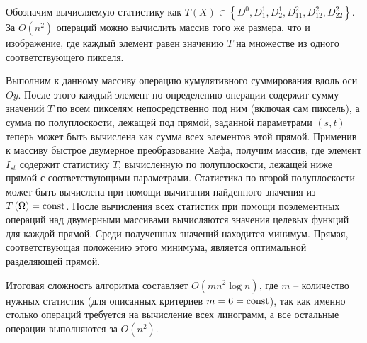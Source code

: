 Обозначим вычисляемую статистику как $T\left( X \right) \in \left\{ D^0, D^1_1, D^1_2, D^2_{11}, D^2_{12}, D^2_{22} \right\}$. За $O\left( n^2 \right)$ операций можно вычислить массив того же размера, что и изображение, где каждый элемент равен значению $T$ на множестве из одного соответствующего пикселя.

Выполним к данному массиву операцию кумулятивного суммирования вдоль оси $Oy$. После этого каждый элемент по определению операции содержит сумму значений $T$ по всем пикселям непосредственно под ним (включая сам пиксель), а сумма по полуплоскости, лежащей под прямой, заданной параметрами $(s, t)$ теперь может быть вычислена как сумма всех элементов этой прямой. Применив к массиву быстрое двумерное преобразование Хафа, получим массив, где элемент $I_{st}$ содержит статистику $T$, вычисленную по полуплоскости, лежащей ниже прямой с соответствующими параметрами. Статистика по второй полуплоскости может быть вычислена при помощи вычитания найденного значения из $T\left( \Omega \right) = \mathrm{const}$. После вычисления всех статистик при помощи поэлементных операций над двумерными массивами вычисляются значения целевых функций для каждой прямой. Среди полученных значений находится минимум. Прямая, соответствующая положению этого минимума, является оптимальной разделяющей прямой.

Итоговая сложность алгоритма составляет $O\left( m n^2 \log n \right)$, где $m$ -- количество нужных статистик (для описанных критериев $m = 6 = \mathrm{const}$), так как именно столько операций требуется на вычисление всех линограмм, а все остальные операции выполняются за $O\left( n^2 \right)$.
